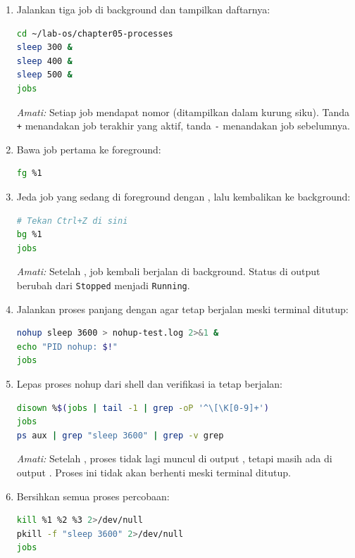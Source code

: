 \begin{enumerate}
    \item Jalankan tiga job di background dan tampilkan daftarnya:
\begin{lstlisting}[language=bash, caption={Menjalankan tiga job di background}]
cd ~/lab-os/chapter05-processes
sleep 300 &
sleep 400 &
sleep 500 &
jobs
\end{lstlisting}
    \textit{Amati:} Setiap job mendapat nomor (ditampilkan dalam kurung siku). Tanda \texttt{+} menandakan job terakhir yang aktif, tanda \texttt{-} menandakan job sebelumnya.

    \item Bawa job pertama ke foreground:
\begin{lstlisting}[language=bash, caption={Membawa job ke foreground}]
fg %1
\end{lstlisting}

    \item Jeda job yang sedang di foreground dengan , lalu kembalikan ke background:
\begin{lstlisting}[language=bash]
# Tekan Ctrl+Z di sini
bg %1
jobs
\end{lstlisting}
    \textit{Amati:} Setelah , job kembali berjalan di background. Status di output  berubah dari \texttt{Stopped} menjadi \texttt{Running}.

    \item Jalankan proses panjang dengan  agar tetap berjalan meski terminal ditutup:
\begin{lstlisting}[language=bash, caption={Menjalankan proses tahan logout}]
nohup sleep 3600 > nohup-test.log 2>&1 &
echo "PID nohup: $!"
jobs
\end{lstlisting}

    \item Lepas proses nohup dari shell dan verifikasi ia tetap berjalan:
\begin{lstlisting}[language=bash, caption={Melepas proses dari shell dengan disown}]
disown %$(jobs | tail -1 | grep -oP '^\[\K[0-9]+')
jobs
ps aux | grep "sleep 3600" | grep -v grep
\end{lstlisting}
    \textit{Amati:} Setelah , proses tidak lagi muncul di output , tetapi masih ada di output . Proses ini tidak akan berhenti meski terminal ditutup.

    \item Bersihkan semua proses percobaan:
\begin{lstlisting}[language=bash, caption={Membersihkan semua proses percobaan}]
kill %1 %2 %3 2>/dev/null
pkill -f "sleep 3600" 2>/dev/null
jobs
\end{lstlisting}
\end{enumerate}

